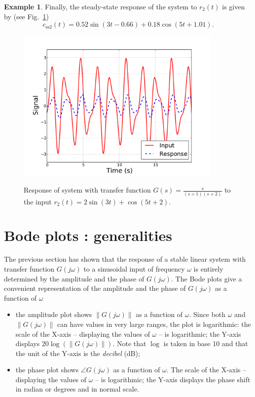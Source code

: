 \documentclass[a4paper,11pt]{report}
\theoremstyle{definition}
\newtheorem{mdexample}{Example}
\newenvironment{example}%
  {\vspace{0.1cm}\begin{mdframed}[backgroundcolor=lightgray]\begin{mdexample}}%
  {\end{mdexample}\end{mdframed}\vspace{0.1cm}}
\begin{document}
\begin{example}
  Finally, the steady-state response of the system to $r_2(t)$ is given
  by (see Fig.~\ref{fig:sine-resp2})
  \[
  c_\mathrm{ss2}(t) = 0.52\sin(3t-0.66) +  0.18\cos(5t+1.01).
  \]

  \begin{figure}[H]
    \centering
    \includegraphics[width=10cm]{fig/sine-resp2.pdf}\\
    \caption{Response of system with transfer function
      $G(s)=\frac{s}{(s+1)(s+2)}$ to the input $r_2(t) = 2\sin(3t) +
      \cos(5t+2)$.} 
    \label{fig:sine-resp2}
  \end{figure}


\end{example}


\section{Bode plots : generalities}

The previous section has shown that the response of a stable linear
system with transfer function $G(j\omega)$ to a sinusoidal input of
frequency $\omega$ is entirely determined by the amplitude and the
phase of $G(j\omega)$. The Bode plots give a convenient representation
of the amplitude and the phase of $G(j\omega)$ as a function of
$\omega$
\begin{itemize}
\item the amplitude plot shows $\|G(j\omega)\|$ as a function of
  $\omega$. Since both $\omega$ and $\|G(j\omega)\|$ can have values
  in very large ranges, the plot is logarithmic: the scale of the
  X-axis -- displaying the values of $\omega$ -- is logarithmic; the
  Y-axis displays $20\log(\|G(j\omega)\|)$. Note that $\log$ is taken
  in base 10 and that the unit of the Y-axis is the \emph{decibel}
  (dB);
\item the phase plot shows $\angle G(j\omega)$ as a function of
  $\omega$. The scale of the X-axis -- displaying the values of
  $\omega$ -- is logarithmic; the Y-axis displays the phase shift in
  radian or degrees and in normal scale.
\end{itemize}
\end{document}
